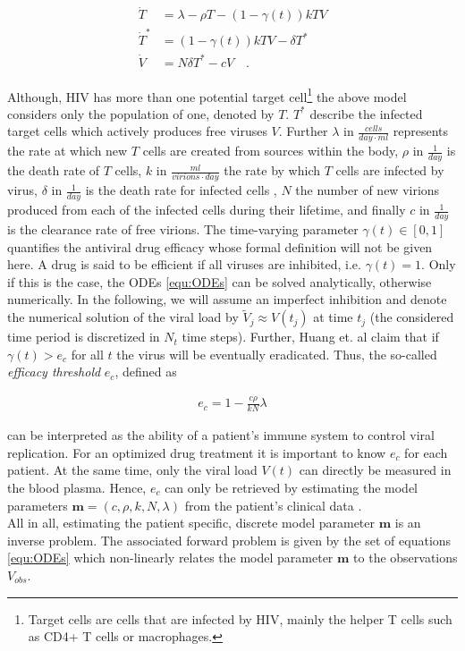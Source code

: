\begin{align}
    \begin{split}
        \dot{T} &= \lambda - \rho T - (1 - \gamma(t))kTV\\
        \dot{T}^{*} &= (1-\gamma(t))kTV-\delta T^{*}\\
        \dot{V} &= N\delta T^{*}-cV \quad \text{.}
    \end{split}
    \label{equ:ODEs}
\end{align}

Although, HIV has more than one potential target cell\footnote{Target cells are cells that are infected by HIV, mainly the helper T cells such as CD4+ T cells or macrophages.} the above model considers only the population of one, denoted by $T$.
$T^*$ describe the infected target cells which actively produces free viruses $V$. 
Further $\lambda$ in $\frac{cells}{day\cdot ml}$ represents the rate at which new $T$ cells are created from sources within the body, $\rho$ in $\frac{1}{day}$ is the death rate of $T$ cells, $k$ in $\frac{ml}{virions\cdot day}$ the rate by which $T$ cells are infected by virus, $\delta$ in $\frac{1}{day}$ is the death rate for infected cells , $N$ the number of new virions produced from each of the infected cells during their lifetime, and finally $c$ in $\frac{1}{day}$ is the clearance rate of free virions. 
The time-varying parameter $\gamma(t) \in [0,1]$ quantifies the antiviral drug efficacy whose formal definition will not be given here.
A drug is said to be efficient if all viruses are inhibited, i.e. $\gamma(t) = 1$.
Only if this is the case, the ODEs \ref{equ:ODEs} can be solved analytically, otherwise numerically.
In the following, we will assume an imperfect inhibition and denote the numerical solution of the viral load by $\tilde{V}_j \approx V(t_j)$ at time $t_j$ (the considered time period is discretized in $N_t$ time steps).
Further, Huang et. al claim that if $\gamma(t) > e_c$ for all $t$ the virus will be eventually eradicated.
Thus, the so-called \textit{efficacy threshold} $e_c$, defined as

\begin{align}
 e_c = 1-\frac{c\rho}{kN}\lambda
 \label{equ:e_c}
\end{align}

can be interpreted as the ability of a patient’s immune system to control viral replication.
For an optimized drug treatment it is important to know $e_c$ for each patient.
At the same time, only the viral load $V(t)$ can directly be measured in the blood plasma.
Hence, $e_c$ can only be retrieved by estimating the model parameters $\mathbf{m} = (c, \rho, k, N, \lambda)$ from the patient's clinical data  \cite{huang2003modeling}.\\
All in all, estimating the patient specific, discrete model parameter $\mathbf{m}$ is an inverse problem.
The associated forward problem is given by the set of equations \ref{equ:ODEs} which non-linearly relates the model parameter $\mathbf{m}$ to the observations $V_{obs}$.